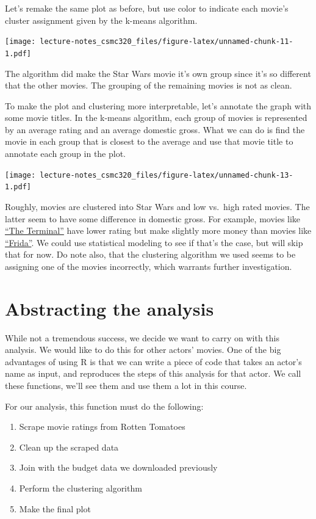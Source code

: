 \documentclass[12pt,]{book}
\providecommand{\tightlist}{%
  \setlength{\itemsep}{0pt}\setlength{\parskip}{0pt}}
\theoremstyle{definition}
\theoremstyle{definition}
\theoremstyle{definition}
\theoremstyle{remark}
\begin{document}
Let's remake the same plot as before, but use color to indicate each
movie's cluster assignment given by the k-means algorithm.

\texttt{[image: lecture-notes\_csmc320\_files/figure-latex/unnamed-chunk-11-1.pdf]}

The algorithm did make the Star Wars movie it's own group since it's so
different that the other movies. The grouping of the remaining movies is
not as clean.

To make the plot and clustering more interpretable, let's annotate the
graph with some movie titles. In the k-means algorithm, each group of
movies is represented by an average rating and an average domestic
gross. What we can do is find the movie in each group that is closest to
the average and use that movie title to annotate each group in the plot.

\texttt{[image: lecture-notes\_csmc320\_files/figure-latex/unnamed-chunk-13-1.pdf]}

Roughly, movies are clustered into Star Wars and low vs.~high rated
movies. The latter seem to have some difference in domestic gross. For
example, movies like
\href{https://www.rottentomatoes.com/m/1133499_1133499_terminal}{``The
Terminal''} have lower rating but make slightly more money than movies
like \href{https://www.rottentomatoes.com/m/frida}{``Frida''}. We could
use statistical modeling to see if that's the case, but will skip that
for now. Do note also, that the clustering algorithm we used seems to be
assigning one of the movies incorrectly, which warrants further
investigation.

\section{Abstracting the analysis}\label{abstracting-the-analysis}

While not a tremendous success, we decide we want to carry on with this
analysis. We would like to do this for other actors' movies. One of the
big advantages of using R is that we can write a piece of code that
takes an actor's name as input, and reproduces the steps of this
analysis for that actor. We call these functions, we'll see them and use
them a lot in this course.

For our analysis, this function must do the following:

\begin{enumerate}
\def\labelenumi{\arabic{enumi}.}
\tightlist
\item
  Scrape movie ratings from Rotten Tomatoes
\item
  Clean up the scraped data
\item
  Join with the budget data we downloaded previously
\item
  Perform the clustering algorithm
\item
  Make the final plot
\end{enumerate}
\end{document}
